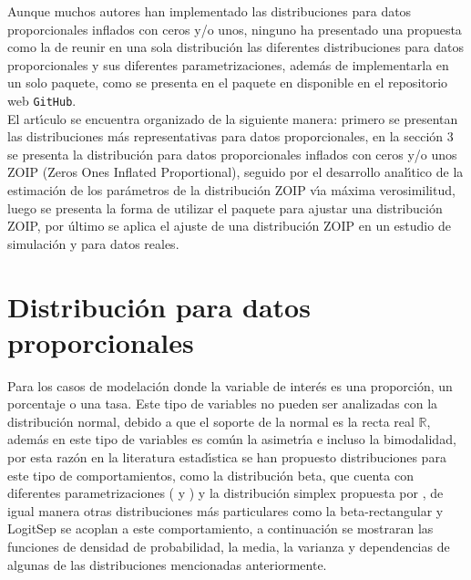 Aunque muchos autores han implementado las distribuciones para datos proporcionales inflados con ceros y/o unos, ninguno ha presentado una propuesta como la de reunir en una sola distribuci\'{o}n las diferentes distribuciones para datos proporcionales y sus diferentes parametrizaciones, adem\'{a}s de implementarla en un solo paquete, como se presenta en el paquete  en \cite{R} disponible en el repositorio web \verb|GitHub|.\\

El art\'{\i}culo se encuentra organizado de la siguiente manera: primero se presentan las distribuciones m\'{a}s representativas para datos proporcionales, en la secci\'{o}n 3 se presenta la distribuci\'{o}n para datos proporcionales inflados con ceros y/o unos ZOIP (Zeros Ones Inflated Proportional), seguido por el desarrollo anal\'{\i}tico de la estimaci\'{o}n de los par\'{a}metros de la distribuci\'{o}n ZOIP v\'{\i}a m\'{a}xima verosimilitud, luego se presenta la forma de utilizar el paquete  para ajustar una distribuci\'{o}n ZOIP, por \'{u}ltimo se aplica el ajuste de una distribuci\'{o}n ZOIP en un estudio de simulaci\'{o}n y para datos reales.


\section{Distribuci\'{o}n para datos proporcionales} \label{Sec_dist_prop}

Para los casos de modelaci\'{o}n donde la variable de inter\'{e}s es una proporci\'{o}n, un porcentaje o una tasa. Este tipo de variables no pueden ser analizadas con la distribuci\'{o}n normal, debido a que el soporte de la normal es la recta real $\mathbb{R}$, adem\'{a}s en este tipo de variables es com\'{u}n la asimetr\'{\i}a e incluso la bimodalidad, por esta raz\'{o}n en la literatura estad\'{\i}stica se han propuesto distribuciones para este tipo de comportamientos, como la distribuci\'{o}n beta, que cuenta con diferentes parametrizaciones (\cite{Ferrari2} y \cite{Stasinopoulos2}) y la distribuci\'{o}n simplex propuesta por \cite{Barndorff1}, de igual manera otras distribuciones m\'{a}s particulares como la beta-rectangular \citep{Hahn1} y LogitSep \citep{Hossain1} se acoplan a este comportamiento, a continuaci\'{o}n se mostraran las funciones de densidad de probabilidad, la media, la varianza y dependencias de algunas de las distribuciones mencionadas anteriormente.

